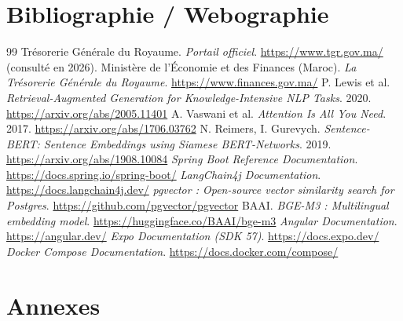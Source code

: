 \documentclass[a4paper,12pt,oneside]{report}
\begin{document}
\chapter*{Bibliographie / Webographie}

\begin{thebibliography}{99}
 Trésorerie Générale du Royaume. \emph{Portail officiel}.
\newblock \url{https://www.tgr.gov.ma/} (consulté en 2026).
 Ministère de l'Économie et des Finances (Maroc).
\emph{La Trésorerie Générale du Royaume}.
\newblock \url{https://www.finances.gov.ma/}
 P. Lewis et al. \emph{Retrieval-Augmented Generation for
Knowledge-Intensive NLP Tasks}. 2020.
\newblock \url{https://arxiv.org/abs/2005.11401}
 A. Vaswani et al. \emph{Attention Is All You Need}. 2017.
\newblock \url{https://arxiv.org/abs/1706.03762}
 N. Reimers, I. Gurevych. \emph{Sentence-BERT: Sentence Embeddings
using Siamese BERT-Networks}. 2019.
\newblock \url{https://arxiv.org/abs/1908.10084}
 \emph{Spring Boot Reference Documentation}.
\newblock \url{https://docs.spring.io/spring-boot/}
 \emph{LangChain4j Documentation}.
\newblock \url{https://docs.langchain4j.dev/}
 \emph{pgvector : Open-source vector similarity search for
Postgres}.
\newblock \url{https://github.com/pgvector/pgvector}
 BAAI. \emph{BGE-M3 : Multilingual embedding model}.
\newblock \url{https://huggingface.co/BAAI/bge-m3}
 \emph{Angular Documentation}.
\newblock \url{https://angular.dev/}
 \emph{Expo Documentation (SDK 57)}.
\newblock \url{https://docs.expo.dev/}
 \emph{Docker Compose Documentation}.
\newblock \url{https://docs.docker.com/compose/}
\end{thebibliography}

\appendix
\chapter{Annexes}
\end{document}
